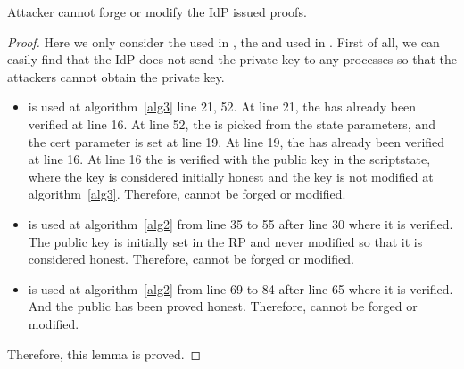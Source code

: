 \begin{appendices}
\begin{relemma}
Attacker cannot forge or modify the IdP issued proofs.
\label{rel:signature}
\end{relemma}
\begin{proof}
Here we only consider the  used in , the  and  used in  . First of all, we can easily find that the IdP does not send the private key to any processes so that the attackers cannot obtain the private key. 
\begin{itemize}
\item {} is used at algorithm~\ref{alg3} line 21, 52. At line 21, the  has already been verified at line 16. At line 52, the  is picked from the state parameters, and the cert parameter is set at line 19.  At line 19, the  has already been verified at line 16.
At line 16 the  is verified with the public key in the scriptstate, where the key is considered initially honest and the key is not modified at algorithm~\ref{alg3}. Therefore,  cannot be forged or modified. 
\item {} is used at algorithm~\ref{alg2} from line 35 to 55 after line 30 where it is verified. The public key is initially set in the RP and never modified so that  it is considered honest. Therefore,  cannot be forged or modified. 
\item {} is used at algorithm~\ref{alg2} from line 69 to 84 after line 65 where it is verified.  And the public has been proved honest. Therefore,  cannot be forged or modified. 
\end{itemize}
Therefore, this lemma is proved.
\end{proof}


\end{appendices}
